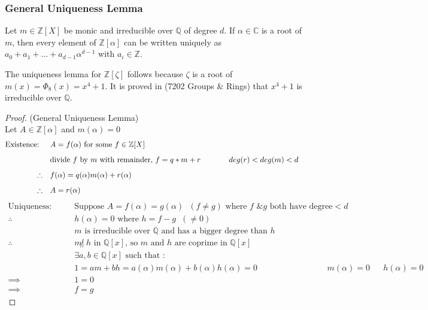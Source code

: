 \documentclass[11pt]{article}
\begin{document}
\subsubsection{General Uniqueness Lemma}
Let $m \in \mathbb{Z}[X]$ be monic and irreducible over $\mathbb{Q}$ of degree $d$. If $\alpha \in \mathbb{C}$ is a root of $m$, then every element of $\mathbb{Z}[\alpha]$ can be written uniquely as $a_0 +a_1+\dots+a_{d-1}\alpha^{d-1}$ with $a_i \in \mathbb{Z}$.

The uniqueness lemma for $\mathbb{Z}[\zeta]$ follows because $\zeta$ is a root of $m(x)= \Phi_8(x) = x^4 +1$. It is proved in (7202 Groups \& Rings) that $x^4 +1$ is irreducible over $\mathbb{Q}$.


\begin{proof}
	(General Uniqueness Lemma)\\[0.5em]
	Let $A \in \mathbb{Z}[\alpha]$ and $m(\alpha) = 0$
	\begin{align*}
		\text{Existence: } && &A= f(\alpha) \text{ for some } f \in \mathbb{Z}[X] \hspace{100pt}\\[0.5em]
		&& &\text{divide $ f $ by $m$ with remainder, } f=q*m+r  && deg(r)<deg(m)<d \\[0.5em]
		\therefore &&&f(\alpha) = q(\alpha) m(\alpha) +r(\alpha)\\[0.5em]
		\therefore &&& A=r(\alpha)\\
	\end{align*}
	\begin{align*}
		\text{Uniqueness: } &&&\text{Suppose }A=f(\alpha) = g(\alpha) \hspace{7pt} (f\neq g) \text{ where $f$ \& $g$ both have degree} <d\\[0.5em]
		\therefore &&&h(\alpha) = 0 \text{ where } h=f-g \hspace{7pt}(\neq 0) \\[0.5em]
		&&& m\text{ is irreducible over $\mathbb{Q}$ and has a bigger degree than $h$}\\[0.5em]
		\therefore&&& m \not |\hspace{3pt} h \text{ in } \mathbb{Q}[x] \text{, so $m$ and $h$ are coprime in $\mathbb{Q}[x]$}\\[1em]
		&&&\exists a,b \in \mathbb{Q}[x] \text{ such that :}\\[0.25em]
		&&& 1= am +bh = a(\alpha)m(\alpha)+b(\alpha)h(\alpha) = 0  \hspace{100pt} m(\alpha)= 0 &&h(\alpha)=0\\[0.25em]
		\implies&&& 1=0 \\[0.1em]
		\implies&&& f=g
	\end{align*}
\end{proof}
\end{document}
